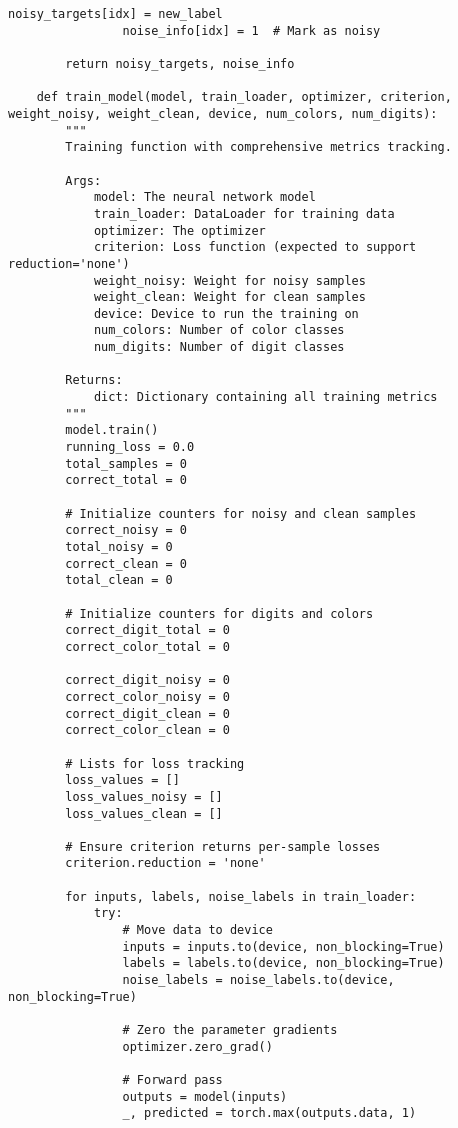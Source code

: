 \begin{lstlisting}[style=pythonstyle, caption={メインコード}]
                noisy_targets[idx] = new_label
                noise_info[idx] = 1  # Mark as noisy
    
        return noisy_targets, noise_info
    
    def train_model(model, train_loader, optimizer, criterion, weight_noisy, weight_clean, device, num_colors, num_digits):
        """
        Training function with comprehensive metrics tracking.
        
        Args:
            model: The neural network model
            train_loader: DataLoader for training data
            optimizer: The optimizer
            criterion: Loss function (expected to support reduction='none')
            weight_noisy: Weight for noisy samples
            weight_clean: Weight for clean samples
            device: Device to run the training on
            num_colors: Number of color classes
            num_digits: Number of digit classes
            
        Returns:
            dict: Dictionary containing all training metrics
        """
        model.train()
        running_loss = 0.0
        total_samples = 0
        correct_total = 0
    
        # Initialize counters for noisy and clean samples
        correct_noisy = 0
        total_noisy = 0
        correct_clean = 0
        total_clean = 0
    
        # Initialize counters for digits and colors
        correct_digit_total = 0
        correct_color_total = 0
    
        correct_digit_noisy = 0
        correct_color_noisy = 0
        correct_digit_clean = 0
        correct_color_clean = 0
    
        # Lists for loss tracking
        loss_values = []
        loss_values_noisy = []
        loss_values_clean = []
    
        # Ensure criterion returns per-sample losses
        criterion.reduction = 'none'
    
        for inputs, labels, noise_labels in train_loader:
            try:
                # Move data to device
                inputs = inputs.to(device, non_blocking=True)
                labels = labels.to(device, non_blocking=True)
                noise_labels = noise_labels.to(device, non_blocking=True)
    
                # Zero the parameter gradients
                optimizer.zero_grad()
    
                # Forward pass
                outputs = model(inputs)
                _, predicted = torch.max(outputs.data, 1)
                

\end{lstlisting}
